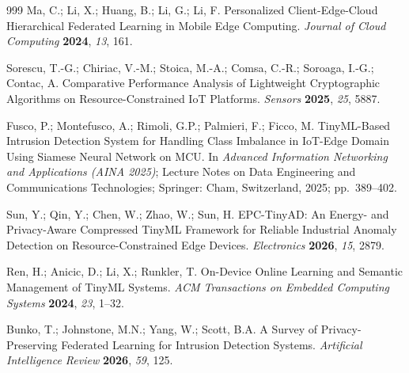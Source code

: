 \documentclass[journal,article,submit,moreauthors]{Definitions/mdpi}
\begin{document}
{\begin{thebibliography}{999}
Ma, C.; Li, X.; Huang, B.; Li, G.; Li, F. Personalized Client-Edge-Cloud Hierarchical Federated Learning in Mobile Edge Computing. \emph{Journal of Cloud Computing} \textbf{2024}, \emph{13}, 161.

Sorescu, T.-G.; Chiriac, V.-M.; Stoica, M.-A.; Comsa, C.-R.; Soroaga, I.-G.; Contac, A. Comparative Performance Analysis of Lightweight Cryptographic Algorithms on Resource-Constrained IoT Platforms. \emph{Sensors} \textbf{2025}, \emph{25}, 5887.

Fusco, P.; Montefusco, A.; Rimoli, G.P.; Palmieri, F.; Ficco, M. TinyML-Based Intrusion Detection System for Handling Class Imbalance in IoT-Edge Domain Using Siamese Neural Network on MCU. In \emph{Advanced Information Networking and Applications (AINA 2025)}; Lecture Notes on Data Engineering and Communications Technologies; Springer: Cham, Switzerland, 2025; pp.~389--402.

Sun, Y.; Qin, Y.; Chen, W.; Zhao, W.; Sun, H. EPC-TinyAD: An Energy- and Privacy-Aware Compressed TinyML Framework for Reliable Industrial Anomaly Detection on Resource-Constrained Edge Devices. \emph{Electronics} \textbf{2026}, \emph{15}, 2879.

Ren, H.; Anicic, D.; Li, X.; Runkler, T. On-Device Online Learning and Semantic Management of TinyML Systems. \emph{ACM Transactions on Embedded Computing Systems} \textbf{2024}, \emph{23}, 1--32.

Bunko, T.; Johnstone, M.N.; Yang, W.; Scott, B.A. A Survey of Privacy-Preserving Federated Learning for Intrusion Detection Systems. \emph{Artificial Intelligence Review} \textbf{2026}, \emph{59}, 125.

\end{thebibliography}
}

\PublishersNote{}
\end{document}
